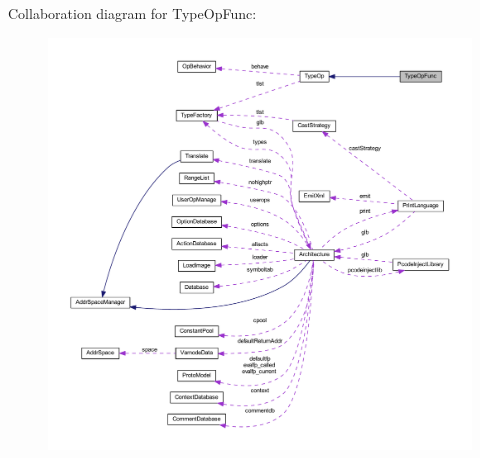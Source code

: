 Collaboration diagram for Type\+Op\+Func\+:
\nopagebreak
\begin{figure}[H]
\begin{center}
\leavevmode
\includegraphics[width=350pt]{class_type_op_func__coll__graph}
\end{center}
\end{figure}
